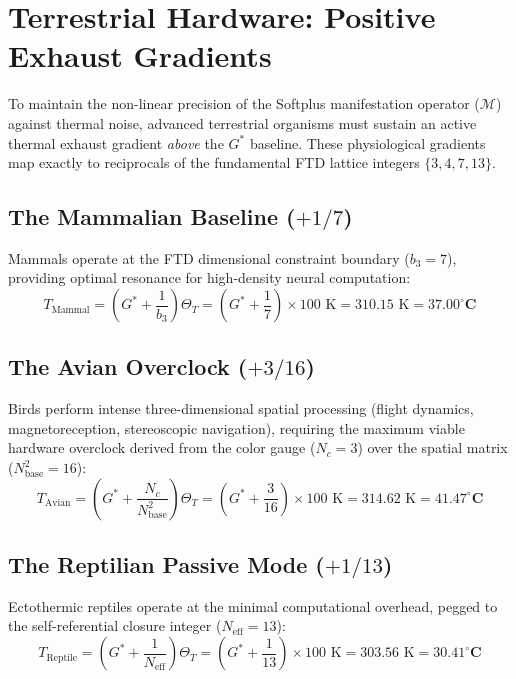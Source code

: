 \documentclass[11pt, letterpaper]{article}
\newcommand{\G}{G^*}
\theoremstyle{definition}
\theoremstyle{remark}
\begin{document}
\section{Terrestrial Hardware: Positive Exhaust Gradients}

To maintain the non-linear precision of the Softplus manifestation operator ($\mathcal{M}$) against thermal noise, advanced terrestrial organisms must sustain an active thermal exhaust gradient \textit{above} the $\G$ baseline. These physiological gradients map exactly to reciprocals of the fundamental FTD lattice integers $\{3, 4, 7, 13\}$.

\subsection{The Mammalian Baseline ($+1/7$)}

Mammals operate at the FTD dimensional constraint boundary ($b_3 = 7$), providing optimal resonance for high-density neural computation:
\begin{equation}
    T_{\text{Mammal}} = \left(\G + \frac{1}{b_3}\right)\Theta_T = \left(\G + \frac{1}{7}\right) \times 100 \text{ K} = 310.15 \text{ K} = \mathbf{37.00^\circ\text{C}}
\end{equation}

\subsection{The Avian Overclock ($+3/16$)}

Birds perform intense three-dimensional spatial processing (flight dynamics, magnetoreception, stereoscopic navigation), requiring the maximum viable hardware overclock derived from the color gauge ($N_c = 3$) over the spatial matrix ($N_{\text{base}}^2 = 16$):
\begin{equation}
    T_{\text{Avian}} = \left(\G + \frac{N_c}{N_{\text{base}}^2}\right)\Theta_T = \left(\G + \frac{3}{16}\right) \times 100 \text{ K} = 314.62 \text{ K} = \mathbf{41.47^\circ\text{C}}
\end{equation}

\subsection{The Reptilian Passive Mode ($+1/13$)}

Ectothermic reptiles operate at the minimal computational overhead, pegged to the self-referential closure integer ($N_{\text{eff}} = 13$):
\begin{equation}
    T_{\text{Reptile}} = \left(\G + \frac{1}{N_{\text{eff}}}\right)\Theta_T = \left(\G + \frac{1}{13}\right) \times 100 \text{ K} = 303.56 \text{ K} = \mathbf{30.41^\circ\text{C}}
\end{equation}
\end{document}
